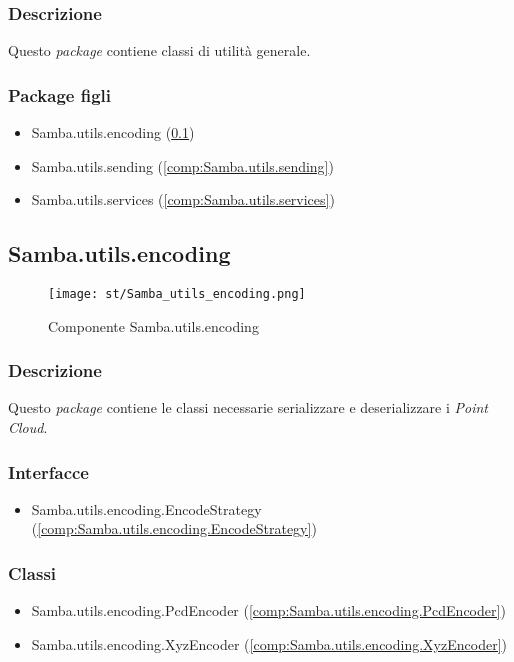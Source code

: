 \subsubsection{Descrizione}
Questo \emph{package} contiene classi di utilità generale.
\subsubsection{Package figli}
\begin{itemize}
	\item Samba.utils.encoding (\ref{comp:Samba.utils.encoding})
	\item Samba.utils.sending (\ref{comp:Samba.utils.sending})
	\item Samba.utils.services (\ref{comp:Samba.utils.services})
\end{itemize}


\newpage
\subsection{Samba.utils.encoding}\label{comp:Samba.utils.encoding}
\begin{figure}[H] 
    \centering 
    \texttt{[image: st/Samba\_utils\_encoding.png]} 
    \caption{Componente Samba.utils.encoding}
\end{figure}
\subsubsection{Descrizione}
Questo \emph{package} contiene le classi necessarie serializzare e deserializzare i \emph{Point Cloud}.
\subsubsection{Interfacce}
\begin{itemize}
	\item Samba.utils.encoding.EncodeStrategy (\ref{comp:Samba.utils.encoding.EncodeStrategy})
\end{itemize}
\subsubsection{Classi}
\begin{itemize}
	\item Samba.utils.encoding.PcdEncoder (\ref{comp:Samba.utils.encoding.PcdEncoder})
	\item Samba.utils.encoding.XyzEncoder (\ref{comp:Samba.utils.encoding.XyzEncoder})  
\end{itemize}

